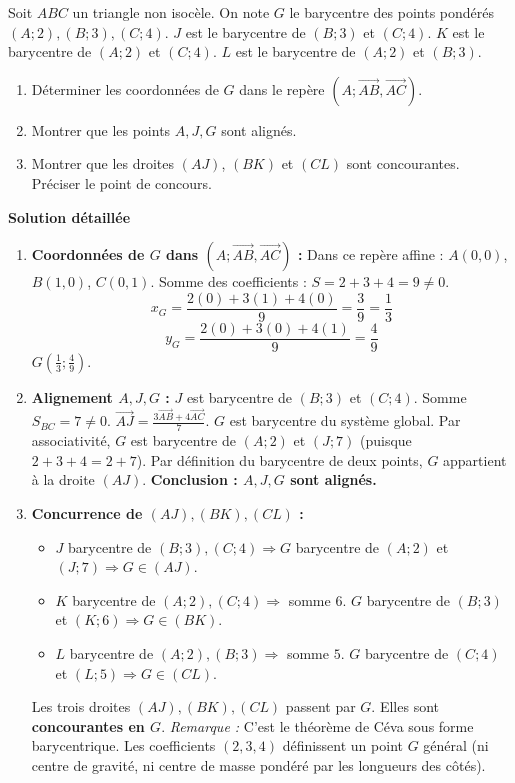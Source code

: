 \documentclass[11pt]{article}
\begin{document}
\begin{exoresolu}
Soit $ABC$ un triangle non isocèle. On note $G$ le barycentre des points pondérés $(A; 2), (B; 3), (C; 4)$.
$J$ est le barycentre de $(B; 3)$ et $(C; 4)$.
$K$ est le barycentre de $(A; 2)$ et $(C; 4)$.
$L$ est le barycentre de $(A; 2)$ et $(B; 3)$.
\begin{enumerate}
    \item Déterminer les coordonnées de $G$ dans le repère $(A; \overrightarrow{AB}, \overrightarrow{AC})$.
    \item Montrer que les points $A, J, G$ sont alignés.
    \item Montrer que les droites $(AJ)$, $(BK)$ et $(CL)$ sont concourantes. Préciser le point de concours.
\end{enumerate}
\tcblower
\textbf{Solution détaillée}
\begin{enumerate}
    \item \textbf{Coordonnées de $G$ dans $(A; \vec{AB}, \vec{AC})$ :}
    Dans ce repère affine : $A(0,0)$, $B(1,0)$, $C(0,1)$.
    Somme des coefficients : $S = 2+3+4 = 9 \neq 0$.
    \[
    x_G = \frac{2(0) + 3(1) + 4(0)}{9} = \frac{3}{9} = \frac{1}{3}
    \]
    \[
    y_G = \frac{2(0) + 3(0) + 4(1)}{9} = \frac{4}{9}
    \]
    \textbf{$G\left(\frac{1}{3}; \frac{4}{9}\right)$}.
    
    \item \textbf{Alignement $A, J, G$ :}
    $J$ est barycentre de $(B;3)$ et $(C;4)$. Somme $S_{BC} = 7 \neq 0$.
    $\overrightarrow{AJ} = \frac{3\overrightarrow{AB} + 4\overrightarrow{AC}}{7}$.
    $G$ est barycentre du système global. Par associativité, $G$ est barycentre de $(A;2)$ et $(J; 7)$ (puisque $2+3+4 = 2+7$).
    Par définition du barycentre de deux points, $G$ appartient à la droite $(AJ)$.
    \textbf{Conclusion : $A, J, G$ sont alignés.}
    
    \item \textbf{Concurrence de $(AJ), (BK), (CL)$ :}
    \begin{itemize}
        \item $J$ barycentre de $(B;3),(C;4) \Rightarrow G$ barycentre de $(A;2)$ et $(J;7) \Rightarrow G \in (AJ)$.
        \item $K$ barycentre de $(A;2),(C;4) \Rightarrow$ somme $6$. $G$ barycentre de $(B;3)$ et $(K;6) \Rightarrow G \in (BK)$.
        \item $L$ barycentre de $(A;2),(B;3) \Rightarrow$ somme $5$. $G$ barycentre de $(C;4)$ et $(L;5) \Rightarrow G \in (CL)$.
    \end{itemize}
    Les trois droites $(AJ), (BK), (CL)$ passent par $G$. Elles sont \textbf{concourantes en $G$}.
    \emph{Remarque :} C'est le théorème de Céva sous forme barycentrique. Les coefficients $(2,3,4)$ définissent un point $G$ général (ni centre de gravité, ni centre de masse pondéré par les longueurs des côtés).
\end{enumerate}
\end{exoresolu}
\end{document}

